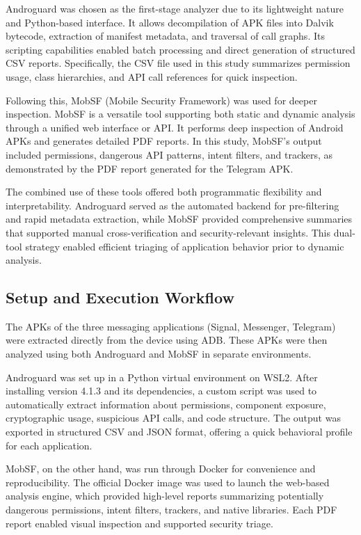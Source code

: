 \documentclass[a4paper,12pt]{report}
\begin{document}
Androguard was chosen as the first-stage analyzer due to its lightweight nature and Python-based interface. It allows decompilation of APK files into Dalvik bytecode, extraction of manifest metadata, and traversal of call graphs. Its scripting capabilities enabled batch processing and direct generation of structured CSV reports. Specifically, the CSV file used in this study summarizes permission usage, class hierarchies, and API call references for quick inspection.

Following this, MobSF (Mobile Security Framework) was used for deeper inspection. MobSF is a versatile tool supporting both static and dynamic analysis through a unified web interface or API. It performs deep inspection of Android APKs and generates detailed PDF reports. In this study, MobSF's output included permissions, dangerous API patterns, intent filters, and trackers, as demonstrated by the PDF report generated for the Telegram APK.

The combined use of these tools offered both programmatic flexibility and interpretability. Androguard served as the automated backend for pre-filtering and rapid metadata extraction, while MobSF provided comprehensive summaries that supported manual cross-verification and security-relevant insights. This dual-tool strategy enabled efficient triaging of application behavior prior to dynamic analysis.



\subsection{Setup and Execution Workflow}

The APKs of the three messaging applications (Signal, Messenger, Telegram) were extracted directly from the device using ADB. These APKs were then analyzed using both Androguard and MobSF in separate environments.

Androguard was set up in a Python virtual environment on WSL2. After installing version 4.1.3 and its dependencies, a custom script was used to automatically extract information about permissions, component exposure, cryptographic usage, suspicious API calls, and code structure. The output was exported in structured CSV and JSON format, offering a quick behavioral profile for each application.

MobSF, on the other hand, was run through Docker for convenience and reproducibility. The official Docker image was used to launch the web-based analysis engine, which provided high-level reports summarizing potentially dangerous permissions, intent filters, trackers, and native libraries. Each PDF report enabled visual inspection and supported security triage.
\end{document}
